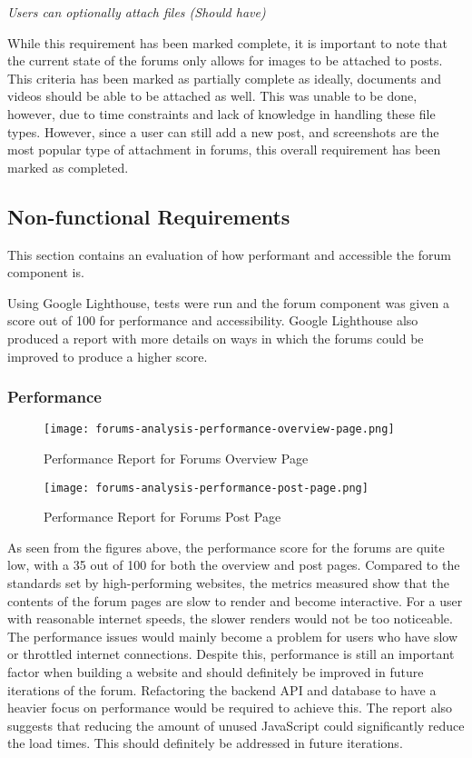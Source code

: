 \textit{Users can optionally attach files (Should have)}

While this requirement has been marked complete, it is important to note that the current state of the forums only allows for images to be attached to posts.
This criteria has been marked as partially complete as ideally, documents and videos should be able to be attached as well.
This was unable to be done, however, due to time constraints and lack of knowledge in handling these file types.
However, since a user can still add a new post, and screenshots are the most popular type of attachment in forums, this overall requirement has been marked as completed.

\subsection{Non-functional Requirements}
This section contains an evaluation of how performant and accessible the forum component is.

Using Google Lighthouse, tests were run and the forum component was given a score out of 100 for performance and accessibility.
Google Lighthouse also produced a report with more details on ways in which the forums could be improved to produce a higher score.

\subsubsection{Performance}

\begin{figure}[h!]
    \texttt{[image: forums-analysis-performance-overview-page.png]}
    \centering
    \caption{Performance Report for Forums Overview Page}
\end{figure}

\begin{figure}[h!]
    \texttt{[image: forums-analysis-performance-post-page.png]}
    \centering
    \caption{Performance Report for Forums Post Page}
\end{figure}

As seen from the figures above, the performance score for the forums are quite low, with a 35 out of 100 for both the overview and post pages.
Compared to the standards set by high-performing websites, the metrics measured show that the contents of the forum pages are slow to render and become interactive.
For a user with reasonable internet speeds, the slower renders would not be too noticeable.
The performance issues would mainly become a problem for users who have slow or throttled internet connections.
Despite this, performance is still an important factor when building a website and should definitely be improved in future iterations of the forum.
Refactoring the backend API and database to have a heavier focus on performance would be required to achieve this.
The report also suggests that reducing the amount of unused JavaScript could significantly reduce the load times.
This should definitely be addressed in future iterations.


